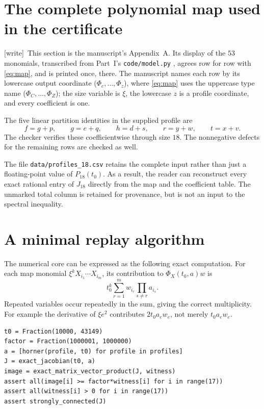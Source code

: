 \documentclass[11pt,a4paper]{article}
\theoremstyle{definition}
\theoremstyle{remark}
\newcommand{\wtag}{\textsf{\small[write]}}
\begin{document}
\section{The complete polynomial map used in the certificate}
\label{kfp:sat:app:map}

\wtag\ This section is the manuscript's Appendix~A. Its display of the
$53$ monomials, transcribed from Part~I's \texttt{code/model.py}
\cite{satmap}, agrees row for row with \eqref{eq:map}, and is printed once,
there. The manuscript names each row by its lowercase output coordinate
($\Phi_c,\ldots,\Phi_z$), where \eqref{eq:map} uses the uppercase type name
($\Phi_C,\ldots,\Phi_Z$); the size variable is $\xi$, the lowercase $z$ is a
profile coordinate, and every coefficient is one.

The five linear partition identities in the supplied profile are
\[
 f=g+p,\qquad g=e+q,\qquad h=d+s,\qquad r=y+w,\qquad t=x+v.
\]
The checker verifies these coefficientwise through size $18$. The
nonnegative defects for the remaining rows are checked as well.

The file \texttt{data/profiles\_18.csv} retains the complete input rather
than just a floating-point value of $P_{18}(t_0)$. As a result, the reader
can reconstruct every exact rational entry of $J_{18}$ directly from the
map and the coefficient table. The unmarked total column is retained for
provenance, but is not an input to the spectral inequality.

\section{A minimal replay algorithm}
\label{kfp:sat:app:algorithm}

The numerical core can be expressed as the following exact computation.
For each map monomial $\xi^kX_{i_1}\cdots X_{i_m}$, its contribution to
$\Phi_X(t_0,a)w$ is
\[
 t_0^k\sum_{r=1}^m w_{i_r}\prod_{s\ne r}a_{i_s}.
\]
Repeated variables occur repeatedly in the sum, giving the correct
multiplicity. For example the derivative of $\xi e^2$ contributes
$2t_0a_e w_e$, not merely $t_0a_e w_e$.

\begin{lstlisting}
t0 = Fraction(10000, 43149)
factor = Fraction(1000001, 1000000)
a = [horner(profile, t0) for profile in profiles]
J = exact_jacobian(t0, a)
image = exact_matrix_vector_product(J, witness)
assert all(image[i] >= factor*witness[i] for i in range(17))
assert all(witness[i] > 0 for i in range(17))
assert strongly_connected(J)
\end{lstlisting}
\end{document}
